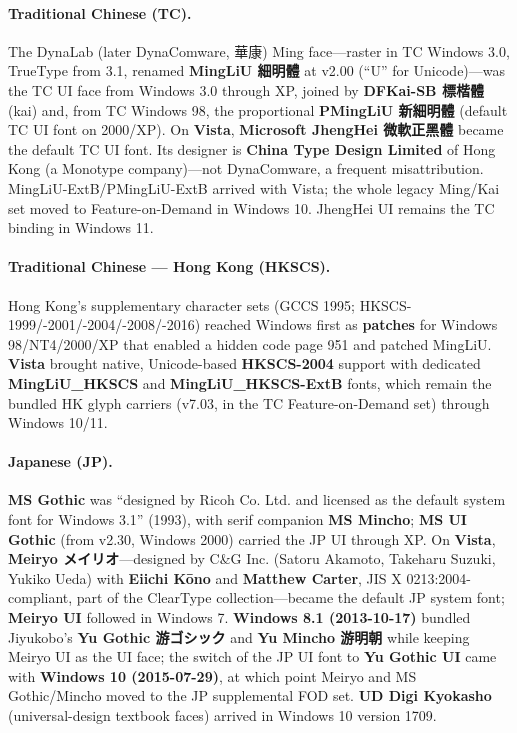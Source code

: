 \documentclass[10pt,a4paper]{article}
\newcommand{\ja}[1]{{\japanesefont #1}}
\begin{document}
\paragraph{Traditional Chinese (TC).} The DynaLab (later DynaComware, 華康) Ming
face---raster in TC Windows 3.0, TrueType from 3.1, renamed \textbf{MingLiU 細明體} at
v2.00 (``U'' for Unicode)---was the TC UI face from Windows 3.0 through XP, joined by
\textbf{DFKai-SB 標楷體} (kai) and, from TC Windows 98, the proportional \textbf{PMingLiU
新細明體} (default TC UI font on 2000/XP). On \textbf{Vista}, \textbf{Microsoft JhengHei
微軟正黑體} became the default TC UI font. Its designer is \textbf{China Type Design
Limited} of Hong Kong (a Monotype company)---not DynaComware, a frequent
misattribution. MingLiU-ExtB/PMingLiU-ExtB arrived with Vista; the whole legacy
Ming/Kai set moved to Feature-on-Demand in Windows 10. JhengHei UI remains the TC
binding in Windows 11.\cite{cw-mingliu,cw-mingliu-2,cw-mingliu-3,cw-kaplan,cw-jhenghei,cw-w10list}

\paragraph{Traditional Chinese --- Hong Kong (HKSCS).} Hong Kong's supplementary
character sets (GCCS 1995; HKSCS-1999/-2001/-2004/-2008/-2016) reached Windows first
as \textbf{patches} for Windows 98/NT4/2000/XP that enabled a hidden code page 951 and
patched MingLiU. \textbf{Vista} brought native, Unicode-based \textbf{HKSCS-2004}
support with dedicated \textbf{MingLiU\_HKSCS} and \textbf{MingLiU\_HKSCS-ExtB} fonts,
which remain the bundled HK glyph carriers (v7.03, in the TC Feature-on-Demand set)
through Windows 10/11.\cite{cw-hkscs,cw-hkscs-2}

\paragraph{Japanese (JP).} \textbf{MS Gothic} was ``designed by Ricoh Co. Ltd. and
licensed as the default system font for Windows 3.1'' (1993), with serif companion
\textbf{MS Mincho}; \textbf{MS UI Gothic} (from v2.30, Windows 2000) carried the JP UI
through XP. On \textbf{Vista}, \textbf{Meiryo \ja{メイリオ}}---designed by C\&G Inc.
(Satoru Akamoto, Takeharu Suzuki, Yukiko Ueda) with \textbf{Eiichi K\=ono} and
\textbf{Matthew Carter}, JIS X 0213:2004-compliant, part of the ClearType
collection---became the default JP system font; \textbf{Meiryo UI} followed in Windows
7. \textbf{Windows 8.1 (2013-10-17)} bundled Jiyukobo's \textbf{Yu Gothic
\ja{游ゴシック}} and \textbf{Yu Mincho \ja{游明朝}} while keeping Meiryo UI as the UI
face; the switch of the JP UI font to \textbf{Yu Gothic UI} came with \textbf{Windows
10 (2015-07-29)}, at which point Meiryo and MS Gothic/Mincho moved to the JP
supplemental FOD set. \textbf{UD Digi Kyokasho} (universal-design textbook faces)
arrived in Windows 10 version
1709.\cite{cw-msgothic,cw-meiryo,cw-meiryo-2,cw-yugothic,cw-fontsupport}
\end{document}
